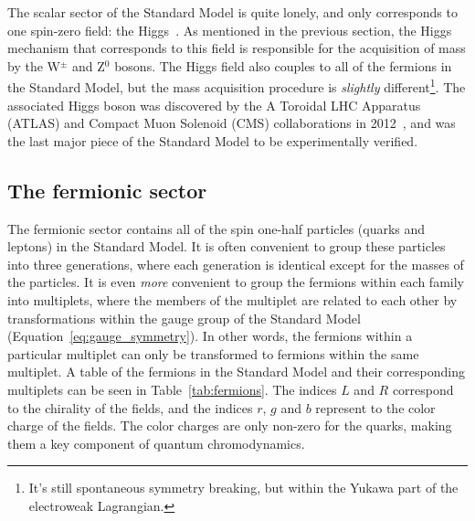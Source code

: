 The scalar sector of the Standard Model is quite lonely, and only corresponds to one spin-zero field: the Higgs~\cite{PeterHiggs}. As mentioned in the previous section, the Higgs mechanism that corresponds to this field is responsible for the acquisition of mass by the W$^{\pm}$ and Z$^{0}$ bosons. The Higgs field also couples to all of the fermions in the Standard Model, but the mass acquisition procedure is \textit{slightly} different\footnote{It's still spontaneous symmetry breaking, but within the Yukawa part of the electroweak Lagrangian.}. The associated Higgs boson was discovered by the A Toroidal LHC Apparatus (ATLAS) and Compact Muon Solenoid (CMS) collaborations in 2012~\cite{HiggsDiscovery1, HiggsDiscovery2}, and was the last major piece of the Standard Model to be experimentally verified.


\subsection{The fermionic sector}
\label{sec:fermion_fields}

The fermionic sector contains all of the spin one-half particles (quarks and leptons) in the Standard Model. It is often convenient to group these particles into three generations, where each generation is identical except for the masses of the particles. It is even \textit{more} convenient to group the fermions within each family into multiplets, where the members of the multiplet are related to each other by transformations within the gauge group of the Standard Model (Equation~\ref{eq:gauge_symmetry}). In other words, the fermions within a particular multiplet can only be transformed to fermions within the same multiplet. A table of the fermions in the Standard Model and their corresponding multiplets can be seen in Table~\ref{tab:fermions}. The indices $L$ and $R$ correspond to the chirality of the fields, and the indices $r$, $g$ and $b$ represent to the color charge of the fields. The color charges are only non-zero for the quarks, making them a key component of quantum chromodynamics.


